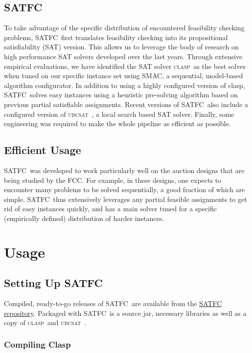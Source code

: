 \documentclass[
10pt, %
letterpaper, %
oneside, %
headinclude,footinclude, %
BCOR5mm, %
needspace, %
]{scrartcl}
\newcommand{\SATFC}{\textsc{SATFC}~}
\newcommand{\clasp}{\textsc{clasp}~}
\newcommand{\ubcsat}{\textsc{ubcsat}~}
\begin{document}
\subsection{\SATFC}
To take advantage of the specific distribution of encountered feasibility checking problems, \SATFC first translates feasibility checking into its propositional satisfiability (SAT) version. This allows us to leverage the body of research on high performance SAT solvers developed over the last years. Through extensive empirical evaluations, we have identified the SAT solver \clasp as the best solver when tuned on our specific instance set using SMAC, a sequential, model-based algorithm configurator. In addition to using a highly configured version of clasp, \SATFC solves easy instances using a heuristic pre-solving algorithm based on previous partial satisfiable assignments. Recent versions of \SATFC also include a configured version of \ubcsat, a local search based SAT solver. Finally, some engineering was required to make the whole pipeline as efficient as possible.

\subsection{Efficient Usage}
\SATFC was developed to work particularly well on the auction designs that are being studied by the FCC. For example, in these designs, one expects to encounter many problems to be solved sequentially, a good fraction of which are simple. \SATFC thus extensively leverages any partial feasible assignments to get rid of easy instances quickly, and has a main solver tuned for a specific (empirically defined) distribution of harder instances.

\section{Usage}\label{sec:usage}

\subsection{Setting Up \SATFC}

Compiled, ready-to-go releases of \SATFC are available from the \href{https://github.com/FCC/SATFC/releases}{SATFC  repository}. Packaged with \SATFC is a source jar, necessary libraries as well as a copy of \clasp and \ubcsat. 

\subsubsection{Compiling Clasp}
\end{document}
